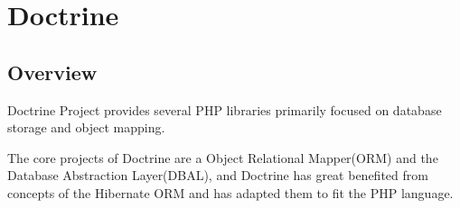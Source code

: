 \part{Doctrine}

\chapter{Overview}

Doctrine Project provides several PHP libraries primarily focused on database storage and object mapping.

The core projects of Doctrine are a Object Relational Mapper(ORM) and the Database Abstraction Layer(DBAL), and Doctrine has great benefited from concepts of the Hibernate ORM and has adapted them to fit the PHP language.



